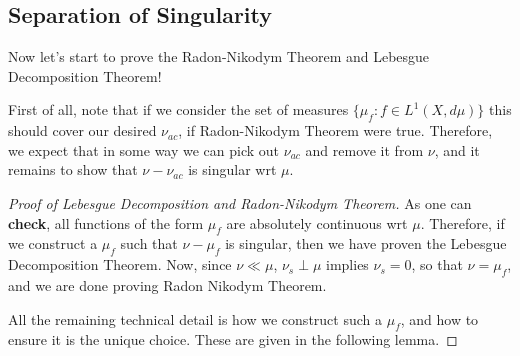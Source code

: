 \subsection{Separation of Singularity}

Now let's start to prove the Radon-Nikodym Theorem and Lebesgue Decomposition Theorem!

First of all, note that if we consider the set of measures $\{\mu_f: f \in L^1(X, d\mu)\} $ this should cover our desired $\nu_{ac}$, if Radon-Nikodym Theorem were true. Therefore, we expect that in some way we can pick out $\nu_{ac}$ and remove it from $\nu$, and it remains to show that $\nu - \nu_{ac}$ is singular wrt $\mu$.

\begin{proof}[Proof of Lebesgue Decomposition and Radon-Nikodym Theorem] 
	

As one can \textbf{check}, all functions of the form $\mu_f$ are absolutely continuous wrt $\mu$. Therefore, if we construct a $\mu_f$ such that $\nu - \mu_f$ is singular, then we have proven the Lebesgue Decomposition Theorem. Now, since $\nu \ll \mu$, $\nu_s \perp \mu$ implies $\nu_s = 0$, so that $\nu = \mu_f$, and we are done proving Radon Nikodym Theorem.

All the remaining technical detail is how we construct such a $\mu_f$, and how to ensure it is the unique choice.
These are given in the following lemma.
\end{proof}

